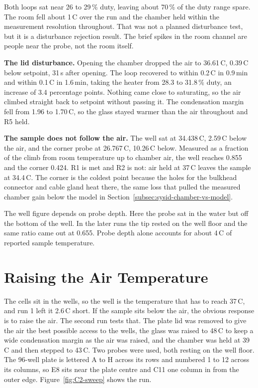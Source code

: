 Both loops sat near 26 to 29\,\% duty, leaving about 70\,\% of the duty range spare. The room fell about 1\,\textdegree{}C over the run and the chamber held within the measurement resolution throughout. That was not a planned disturbance test, but it is a disturbance rejection result. The brief spikes in the room channel are people near the probe, not the room itself.

\textbf{The lid disturbance.} Opening the chamber dropped the air to 36.61\,\textdegree{}C, 0.39\,\textdegree{}C below setpoint, 31\,s after opening. The loop recovered to within 0.2\,\textdegree{}C in 0.9\,min and within 0.1\,\textdegree{}C in 1.6\,min, taking the heater from 28.3 to 31.8\,\% duty, an increase of 3.4 percentage points. Nothing came close to saturating, so the air climbed straight back to setpoint without passing it. The condensation margin fell from 1.96 to 1.70\,\textdegree{}C, so the glass stayed warmer than the air throughout and R5 held.


\textbf{The sample does not follow the air.} The well sat at 34.438\,\textdegree{}C, 2.59\,\textdegree{}C below the air, and the corner probe at 26.767\,\textdegree{}C, 10.26\,\textdegree{}C below. Measured as a fraction of the climb from room temperature up to chamber air, the well reaches 0.855 and the corner 0.424. R1 is met and R2 is not: air held at 37\,\textdegree{}C leaves the sample at 34.4\,\textdegree{}C. The corner is the coldest point because the holes for the bulkhead connector and cable gland heat there, the same loss that pulled the measured chamber gain below the model in Section~\ref{subsec:sysid-chamber-vs-model}.

The well figure depends on probe depth. Here the probe sat in the water but off the bottom of the well. In the later runs the tip rested on the well floor and the same ratio came out at 0.655. Probe depth alone accounts for about 4\,\textdegree{}C of reported sample temperature.


\section{Raising the Air Temperature}
\label{sec:cl-test2}

The cells sit in the wells, so the well is the temperature that has to reach 37\,\textdegree{}C, and run 1 left it 2.6\,\textdegree{}C short. If the sample sits below the air, the obvious response is to raise the air. The second run tests that. The plate lid was removed to give the air the best possible access to the wells, the glass was raised to 48\,\textdegree{}C to keep a wide condensation margin as the air was raised, and the chamber was held at 39\,\textdegree{}C and then stepped to 43\,\textdegree{}C. Two probes were used, both resting on the well floor. The 96-well plate is lettered A to H across its rows and numbered 1 to 12 across its columns, so E8 sits near the plate centre and C11 one column in from the outer edge. Figure~\ref{fig:C2-sweep} shows the run.

